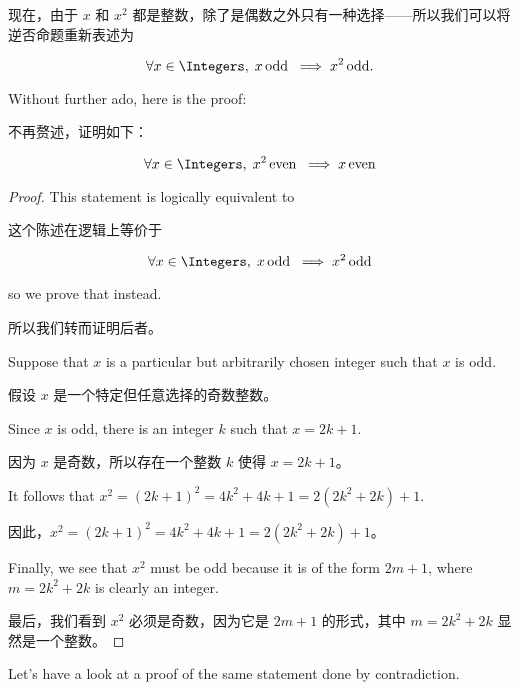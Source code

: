 现在，由于 $x$ 和 $x^2$ 都是整数，除了是偶数之外只有一种选择——所以我们可以将逆否命题重新表述为

\[ \forall x \in \Integers, \; x \, \mbox{odd} \; \implies x^2 \, \mbox{odd}. 
\]

Without further ado, here is the proof:

不再赘述，证明如下：

\begin{thm}
\[ \forall x \in \Integers, \; x^2 \, \mbox{even} \; 
\implies x \, \mbox{even} 
\]
\end{thm}
\begin{proof}
This statement is logically equivalent to 

这个陈述在逻辑上等价于

\[ \forall x \in \Integers, \; x \, \mbox{odd} \; \implies x^2 \, \mbox{odd} 
\]

\noindent so we prove that instead.

\noindent 所以我们转而证明后者。

Suppose that $x$ is a particular but arbitrarily chosen integer
such that $x$ is odd.

假设 $x$ 是一个特定但任意选择的奇数整数。

Since $x$ is odd, there is an integer $k$ such that
$x=2k+1$.

因为 $x$ 是奇数，所以存在一个整数 $k$ 使得 $x=2k+1$。

It follows that 
$x^2 = (2k + 1)^2 = 4k^2 + 4k + 1 = 2(2k^2 + 2k) + 1$.

因此，$x^2 = (2k + 1)^2 = 4k^2 + 4k + 1 = 2(2k^2 + 2k) + 1$。

Finally, we see that $x^2$ must be odd because it is of the form $2m+1$, where
$m = 2k^2 + 2k$ is clearly an integer.

最后，我们看到 $x^2$ 必须是奇数，因为它是 $2m+1$ 的形式，其中 $m = 2k^2 + 2k$ 显然是一个整数。
\end{proof}

Let's have a look at a proof of the same statement done by contradiction.

